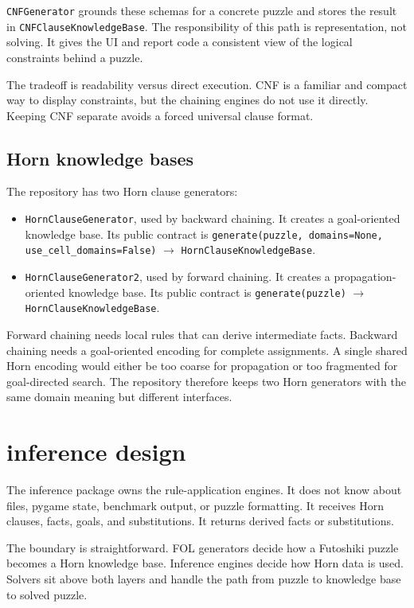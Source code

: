 \documentclass[11pt]{article}
\begin{document}
\texttt{CNFGenerator} grounds these schemas for a concrete puzzle and stores
the result in \texttt{CNFClauseKnowledgeBase}. The responsibility of this path
is representation, not solving. It gives the UI and report code a consistent
view of the logical constraints behind a puzzle.

The tradeoff is readability versus direct execution. CNF is a familiar and
compact way to display constraints, but the chaining engines do not use it
directly. Keeping CNF separate avoids a forced universal clause format.

\subsection{Horn knowledge bases}

The repository has two Horn clause generators:

\begin{itemize}
  \item \texttt{HornClauseGenerator}, used by backward chaining. It creates a
        goal-oriented knowledge base. Its public contract is
        \texttt{generate(puzzle, domains=None, use\_cell\_domains=False)}
        \(\rightarrow\) \texttt{HornClauseKnowledgeBase}.
  \item \texttt{HornClauseGenerator2}, used by forward chaining. It creates
        a propagation-oriented knowledge base. Its public contract is
        \texttt{generate(puzzle)} \(\rightarrow\)
        \texttt{HornClauseKnowledgeBase}.
\end{itemize}

Forward chaining needs local rules that can derive intermediate facts.
Backward chaining needs a goal-oriented encoding for complete assignments. A
single shared Horn encoding would either be too coarse for propagation or too
fragmented for goal-directed search. The repository therefore keeps two Horn
generators with the same domain meaning but different interfaces.

\section{inference design}

The inference package owns the rule-application engines. It does not know about
files, pygame state, benchmark output, or puzzle formatting. It receives Horn
clauses, facts, goals, and substitutions. It returns derived facts or
substitutions.

The boundary is straightforward. FOL generators decide how a Futoshiki puzzle
becomes a Horn knowledge base. Inference engines decide how Horn data is used.
Solvers sit above both layers and handle the path from puzzle to knowledge base
to solved puzzle.
\end{document}
